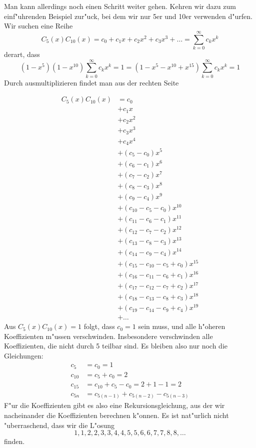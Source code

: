 Man kann allerdings noch einen Schritt weiter gehen. Kehren wir dazu zum
einf"uhrenden Beispiel zur"uck, bei dem wir nur 5er und 10er verwenden
d"urfen. Wir suchen eine Reihe
\[
C_5(x)C_{10}(x)=c_0+c_1x+c_2x^2+c_3x^3+\dots=\sum_{k=0}^\infty c_kx^k
\]
derart, dass
\[
(1-x^5)(1-x^{10}) \sum_{k=0}^\infty c_kx^k=1
=
(1-x^5-x^{10}+x^{15}) \sum_{k=0}^\infty c_kx^k=1
\]
Durch ausmultiplizieren findet man aus der rechten Seite

{\allowdisplaybreaks
\begin{align*}
C_5(x)C_{10}(x)&=c_0\\
&+c_1x\\
&+c_2x^2\\
&+c_3x^3\\
&+c_4x^4\\
&+(c_5-c_0)x^5\\
&+(c_6-c_1)x^6\\
&+(c_7-c_2)x^7\\
&+(c_8-c_3)x^8\\
&+(c_9-c_4)x^9\\
&+(c_{10} - c_5 -c_0)x^{10}\\
&+(c_{11} - c_6 -c_1)x^{11}\\
&+(c_{12} - c_7 -c_2)x^{12}\\
&+(c_{13} - c_8 -c_3)x^{13}\\
&+(c_{14} - c_9 -c_4)x^{14}\\
&+(c_{15} - c_{10} - c_{5} +c_0)x^{15}\\
&+(c_{16} - c_{11} - c_{6} +c_1)x^{16}\\
&+(c_{17} - c_{12} - c_{7} +c_2)x^{17}\\
&+(c_{18} - c_{13} - c_{8} +c_3)x^{18}\\
&+(c_{19} - c_{14} - c_{9} +c_4)x^{19}\\
&+\dots
\end{align*}
}
Aus $C_{5}(x)C_{10}(x)=1$ folgt, dass $c_0=1$ sein muss, und alle
h"oheren Koeffizienten m"ussen verschwinden. Insbesondere verschwinden
alle Koeffizienten, die nicht durch 5 teilbar sind. Es bleiben also nur noch
die Gleichungen:
\begin{align*}
c_5&=c_0=1\\
c_{10}&=c_5+c_0=2\\
c_{15}&=c_{10}+c_{5}-c_0=2 + 1 - 1=2\\
c_{5n}&=c_{5(n-1)}+c_{5(n-2)}-c_{5(n-3)}
\end{align*}
F"ur die Koeffizienten gibt es also eine Rekursionsgleichung, aus der wir
nacheinander die Koeffizienten berechnen k"onnen. Es ist nat"urlich nicht
"uberraschend, dass wir die L"osung
\[
1, 1, 2, 2, 3, 3, 4, 4, 5, 5, 6, 6, 7, 7, 8, 8, \dots
\]
finden.

